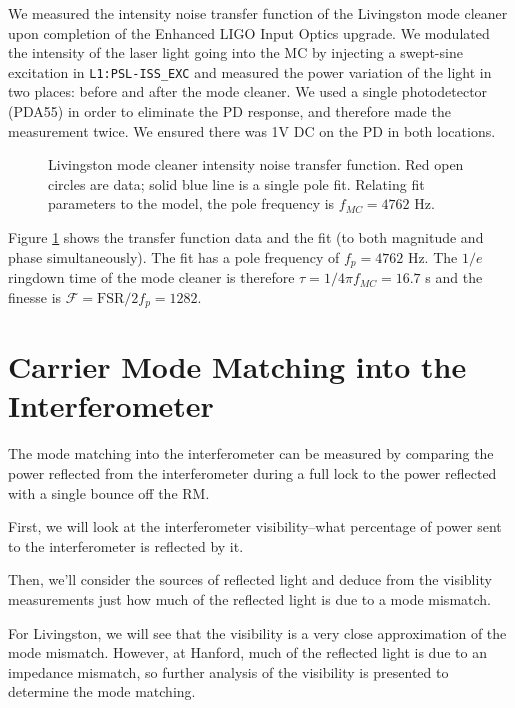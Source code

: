 We measured the intensity noise transfer function of the Livingston
mode cleaner upon completion of the Enhanced LIGO Input Optics
upgrade. We modulated the intensity of the laser light going into the
MC by injecting a swept-sine excitation in \texttt{L1:PSL-ISS\_EXC}
and measured the power variation of the light in two places: before
and after the mode cleaner. We used a single photodetector (PDA55) in
order to eliminate the PD response, and therefore made the measurement
twice. We ensured there was 1V DC on the PD in both locations.

\begin{figure}
\begin{centering}
\caption[Livingston mode cleaner intensity noise transfer
function]{Livingston mode cleaner intensity noise transfer
  function. Red open circles are data; solid blue line is a single
  pole fit. Relating fit parameters to the model, the pole frequency
  is $f_{MC}=4762$ Hz.}
\label{fig:mcpole}
\end{centering}
\end{figure}

Figure \ref{fig:mcpole} shows the transfer function data and the fit
(to both magnitude and phase simultaneously). The fit has a pole
frequency of $f_p=4762$ Hz. The $1/e$ ringdown time of the mode
cleaner is therefore $\tau = 1/4\pi f_{MC} = 16.7$ \micro s and the
finesse is $\mathcal{F} = \mathrm{FSR}/2f_p = 1282$.





\section{Carrier Mode Matching into the Interferometer}

The mode matching into the interferometer can be measured by comparing
the power reflected from the interferometer during a full lock to the
power reflected with a single bounce off the RM.

First, we will look at the interferometer visibility--what percentage
of power sent to the interferometer is reflected by it. 

Then, we'll
consider the sources of reflected light and deduce from the visiblity
measurements just how much of the reflected light is due to a mode
mismatch. 

For Livingston, we will see that the visibility is a very
close approximation of the mode mismatch. However, at Hanford, much of
the reflected light is due to an impedance mismatch, so further
analysis of the visibility is presented to determine the mode
matching.



